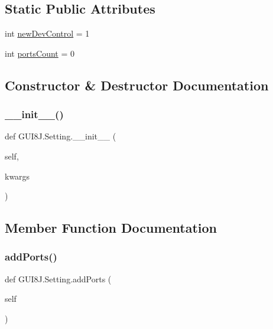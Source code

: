 \subsection*{Static Public Attributes}
\begin{DoxyCompactItemize}
\item 
int \hyperlink{classGUI8J_1_1Setting_ad625b46a7885d6efc1ebc89757198535}{new\+Dev\+Control} = 1
\item 
int \hyperlink{classGUI8J_1_1Setting_a933f2a216db83607cc735ae034d40075}{ports\+Count} = 0
\end{DoxyCompactItemize}


\subsection{Constructor \& Destructor Documentation}
\mbox{\label{classGUI8J_1_1Setting_a118bbfa6da2c767281df5be11f562fff}} 
\subsubsection{\texorpdfstring{\+\_\+\+\_\+init\+\_\+\+\_\+()}{\_\_init\_\_()}}
{\footnotesize\ttfamily def G\+U\+I8\+J.\+Setting.\+\_\+\+\_\+init\+\_\+\+\_\+ (\begin{DoxyParamCaption}\item[{}]{self,  }\item[{}]{kwargs }\end{DoxyParamCaption})}



\subsection{Member Function Documentation}
\mbox{\label{classGUI8J_1_1Setting_a4f425d03b5c2b8273f01d7e09c3d70bd}} 
\subsubsection{\texorpdfstring{add\+Ports()}{addPorts()}}
{\footnotesize\ttfamily def G\+U\+I8\+J.\+Setting.\+add\+Ports (\begin{DoxyParamCaption}\item[{}]{self }\end{DoxyParamCaption})}

